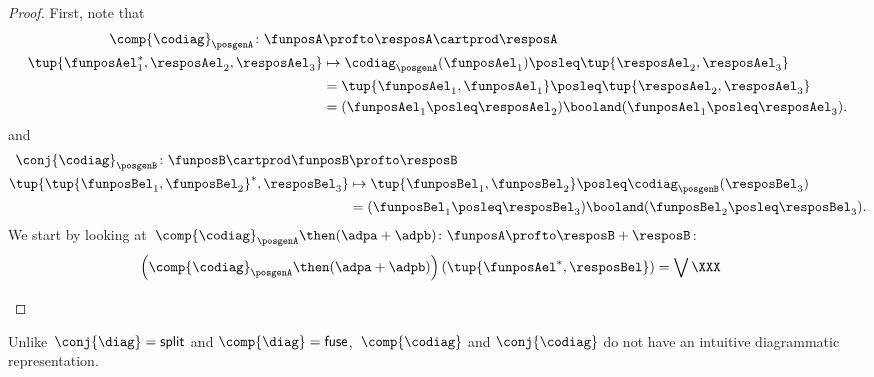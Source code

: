 \begin{proof}
    First, note that
    \begin{equation}
        \begin{aligned}
            \comp{\codiag}_\posgenA \colon \funposA&\profto \resposA\cartprod \resposA\\
            \tup{\funposAel_1^*,\resposAel_2,\resposAel_3}&\mapsto \codiag_\posgenA(\funposAel_1)\posleq \tup{\resposAel_2,\resposAel_3}\\
            &= \tup{\funposAel_1,\funposAel_1}\posleq \tup{\resposAel_2,\resposAel_3}\\
            &= (\funposAel_1\posleq \resposAel_2) \booland (\funposAel_1\posleq \resposAel_3).
        \end{aligned}
    \end{equation}
    and
    \begin{equation}
        \begin{aligned}
            \conj{\codiag}_\posgenB \colon \funposB\cartprod \funposB&\profto \resposB\\
            \tup{\tup{\funposBel_1,\funposBel_2}^*,\resposBel_3}&\mapsto \tup{\funposBel_1,\funposBel_2}\posleq \codiag_\posgenB(\resposBel_3)\\
            &= (\funposBel_1\posleq \resposBel_3) \booland (\funposBel_2\posleq \resposBel_3).
        \end{aligned}
    \end{equation}
    We start by looking at~$\comp{\codiag}_\posgenA \then (\adpa+\adpb) \colon \funposA\profto \resposB+\resposB$:
    \begin{equation}
        \begin{aligned}
            \left(\comp{\codiag}_\posgenA\then (\adpa+\adpb)\right)\left(\tup{\funposAel^*,\resposBel}\right)&=\bigvee_{} \XXX
        \end{aligned}
    \end{equation}
\end{proof}
Unlike~$\conj{\diag} = \mathsf{split}$ and $\comp{\diag} = \mathsf{fuse}$,~$\comp{\codiag}$ and $\conj{\codiag}$ do not have an intuitive diagrammatic representation.
